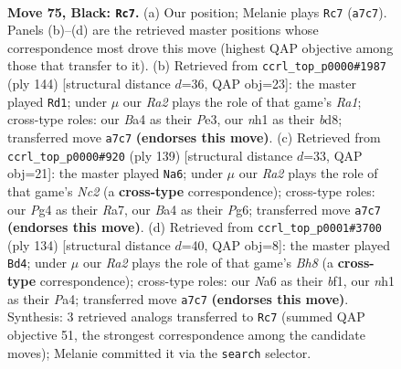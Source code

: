 \documentclass[11pt]{article}
\begin{document}
\clearpage

\begin{figure}[p]\centering
\begin{subfigure}{0.46\textwidth}\centering
\resizebox{\linewidth}{!}{%
\newchessgame
\chessboard[
  setfen={8/r4p2/n5p1/3BP2p/b4Pp1/8/3k1K1P/7N b - - 9 75},
  showmover=false,
  pgfstyle=straightmove, color=movearrow, markmove={a7-c7}
]}
\caption{}
\end{subfigure}\hfill
\begin{subfigure}{0.46\textwidth}\centering
\resizebox{\linewidth}{!}{%
\newchessgame
\chessboard[
  setfen={3b4/8/1kb5/p6p/Pp3P2/4P1P1/1P2K3/R7 w - - 17 73},
  showmover=false,
  pgfstyle=straightmove, color=movearrow, markmove={a1-d1}
]}
\caption{}
\end{subfigure}
\\[4pt]
\begin{subfigure}{0.46\textwidth}\centering
\resizebox{\linewidth}{!}{%
\newchessgame
\chessboard[
  setfen={8/r1n4k/5pp1/7p/1BN4P/3K1BP1/8/8 b - - 7 70},
  showmover=false,
  pgfstyle=straightmove, color=movearrow, markmove={c7-a6}
]}
\caption{}
\end{subfigure}\hfill
\begin{subfigure}{0.46\textwidth}\centering
\resizebox{\linewidth}{!}{%
\newchessgame
\chessboard[
  setfen={7B/7p/p2k2p1/3n1p2/P6P/1B4P1/3K1P2/5b2 w - - 45 68},
  showmover=false,
  pgfstyle=straightmove, color=movearrow, markmove={h8-d4}
]}
\caption{}
\end{subfigure}
\caption{\textbf{Move 75, Black: \texttt{Rc7}.} (a) Our position; Melanie plays \texttt{Rc7} (\texttt{a7c7}). Panels (b)--(d) are the retrieved master positions whose correspondence most drove this move (highest QAP objective among those that transfer to it). (b) Retrieved from \texttt{ccrl\_top\_p0000\#1987} (ply 144) [structural distance $d$=36, QAP obj=23]: the master played \texttt{Rd1}; under $\mu$ our \emph{Ra2} plays the role of that game's \emph{Ra1}; cross-type roles: our \emph{B}a4 as their \emph{P}e3, our \emph{n}h1 as their \emph{b}d8; transferred move \texttt{a7c7} \textbf{(endorses this move)}. (c) Retrieved from \texttt{ccrl\_top\_p0000\#920} (ply 139) [structural distance $d$=33, QAP obj=21]: the master played \texttt{Na6}; under $\mu$ our \emph{Ra2} plays the role of that game's \emph{Nc2} (a \textbf{cross-type} correspondence); cross-type roles: our \emph{P}g4 as their \emph{R}a7, our \emph{B}a4 as their \emph{P}g6; transferred move \texttt{a7c7} \textbf{(endorses this move)}. (d) Retrieved from \texttt{ccrl\_top\_p0001\#3700} (ply 134) [structural distance $d$=40, QAP obj=8]: the master played \texttt{Bd4}; under $\mu$ our \emph{Ra2} plays the role of that game's \emph{Bh8} (a \textbf{cross-type} correspondence); cross-type roles: our \emph{N}a6 as their \emph{b}f1, our \emph{n}h1 as their \emph{P}a4; transferred move \texttt{a7c7} \textbf{(endorses this move)}. Synthesis: 3 retrieved analogs transferred to \texttt{Rc7} (summed QAP objective 51, the strongest correspondence among the candidate moves); Melanie committed it via the \texttt{search} selector.}
\label{fig:thought-m149}
\end{figure}
\end{document}
